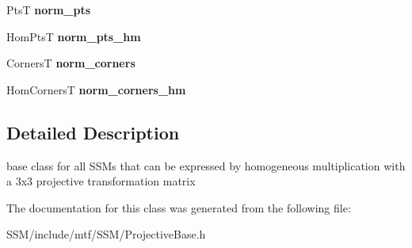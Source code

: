 \begin{DoxyCompactItemize}
\item 
\hypertarget{classProjectiveBase_abffab6e89ab313973c8af3c5acbdb1f7}{Pts\-T {\bfseries norm\-\_\-pts}}\label{classProjectiveBase_abffab6e89ab313973c8af3c5acbdb1f7}

\item 
\hypertarget{classProjectiveBase_acb53795da251bf9c1b4eccb17d8e67d5}{Hom\-Pts\-T {\bfseries norm\-\_\-pts\-\_\-hm}}\label{classProjectiveBase_acb53795da251bf9c1b4eccb17d8e67d5}

\item 
\hypertarget{classProjectiveBase_a7747ba618a08b561e3071d0703c52f92}{Corners\-T {\bfseries norm\-\_\-corners}}\label{classProjectiveBase_a7747ba618a08b561e3071d0703c52f92}

\item 
\hypertarget{classProjectiveBase_a6be3d7cc4a8f2273d6b25255f4eb9ab1}{Hom\-Corners\-T {\bfseries norm\-\_\-corners\-\_\-hm}}\label{classProjectiveBase_a6be3d7cc4a8f2273d6b25255f4eb9ab1}

\end{DoxyCompactItemize}


\subsection{Detailed Description}
base class for all S\-S\-Ms that can be expressed by homogeneous multiplication with a 3x3 projective transformation matrix 

The documentation for this class was generated from the following file\-:\begin{DoxyCompactItemize}
\item 
S\-S\-M/include/mtf/\-S\-S\-M/Projective\-Base.\-h\end{DoxyCompactItemize}
